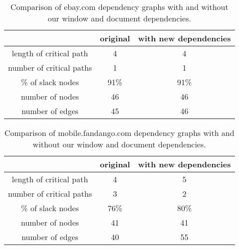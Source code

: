 \begin{table*}[tb]
\centering
\small
\begin{tabular}{|c|c|c|}
\hline
 & original & with new dependencies \\
\hline
length of critical path & 4 & 4 \\
number of critical paths & 1 & 1 \\
\% of slack nodes & 91\% & 91\% \\
number of nodes & 46 & 46 \\
number of edges & 45 & 46 \\
\hline
\end{tabular}\caption{Comparison of ebay.com dependency graphs with and without our window and document dependencies.}
\label{t:ebaygraph}
\end{table*}

\begin{table*}[tb]
\centering
\small
\begin{tabular}{|c|c|c|}
\hline
 & original & with new dependencies \\
\hline
length of critical path & 4 & 5 \\
number of critical paths & 3 & 2 \\
\% of slack nodes & 76\% & 80\% \\
number of nodes & 41 & 41 \\
number of edges & 40 & 55 \\
\hline
\end{tabular}\caption{Comparison of mobile.fandango.com dependency graphs with and without our window and document dependencies.}
\label{t:fandangograph}
\end{table*}
